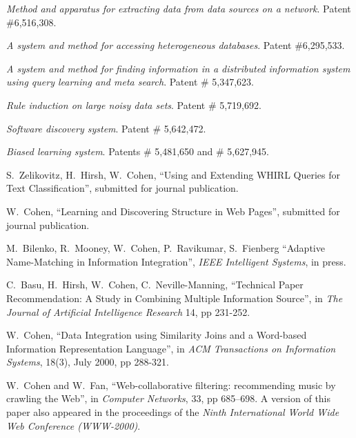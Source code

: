 \bi
\item {\em Method and apparatus for extracting data from data sources on 
a network}.  Patent \#6,516,308.
\item {\em A system and method for accessing heterogeneous databases}.
Patent \#6,295,533.
\item {\em A system and method for finding information in a
distributed information system using query learning
and meta search}.  Patent \# 5,347,623.
\item {\em Rule induction on large noisy data sets}.  Patent \# 5,719,692.
\item {\em Software discovery system}.  Patent \#  5,642,472. 
\item {\em Biased learning system}.  Patents \# 5,481,650 and \# 5,627,945.
\ei

\newpage


\bd
\item[submitted] S.~Zelikovitz, H.~Hirsh, W.~Cohen,
	``Using and Extending WHIRL Queries for Text Classification'',
	submitted for journal publication.

\item[submitted] W.~Cohen, ``Learning and Discovering Structure in Web Pages'',
	submitted for journal publication.	

\item[in press] M.~Bilenko, R.~Mooney, W.~Cohen, P.~Ravikumar, S.~Fienberg
	``Adaptive Name-Matching in Information Integration'',
	{\it IEEE Intelligent Systems}, in press.

\item[2001] C.~Basu, H.~Hirsh, W.~Cohen, C.~Neville-Manning,
	``Technical Paper Recommendation: A Study in Combining
	  Multiple Information Source'', in {\it 
	  The Journal of Artificial Intelligence Research} 14,
	  pp 231-252.

\item[2000] W.~Cohen, 
	``Data Integration using Similarity Joins and
	a Word-based Information Representation Language'', 	
	in {\it ACM Transactions on Information Systems},
	18(3), July 2000, pp 288-321.

\item[2000] W.~Cohen and W.~Fan, ``Web-collaborative filtering: recommending
music by crawling the Web'', in {\it Computer Networks}, 33, pp 685--698.
	A version of this paper also appeared in the proceedings of
	the {\em Ninth International World Wide Web Conference
	(WWW-2000)}.


